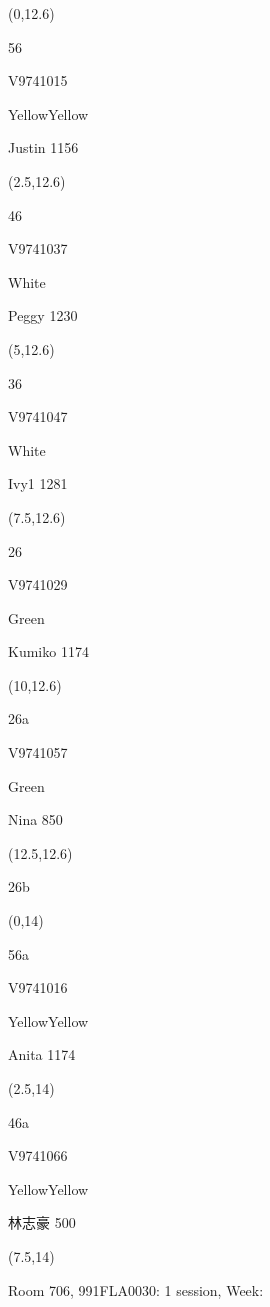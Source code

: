 \documentclass[a4paper]{article}
\newcommand{\myseat}[5]{%
\vspace{-0.1cm}
\parbox[t][2.2cm][t]{3.5cm}{
\small #1 %
\begin{description}
\vspace{-0.1cm}
\item [ID:] #2
\vspace{-0.1cm}
\item [Team:] #3 \normalsize
\vspace{-0.1cm}
\item \normalsize #4 #5
\vspace{-0.1cm}
\end{description}
}
}
\begin{document}
\begin{CJK}{UTF8}{cyberbit}
\begin{textblock}{2.5}(0,12.6)
\myseat{56}{V9741015}{YellowYellow}{Justin}{1156}
\end{textblock}

\begin{textblock}{2.5}(2.5,12.6)
\myseat{46}{V9741037}{White}{Peggy}{1230}
\end{textblock}

\begin{textblock}{2.5}(5,12.6)
\myseat{36}{V9741047}{White}{Ivy1}{1281}
\end{textblock}

\begin{textblock}{2.5}(7.5,12.6)
\myseat{26}{V9741029}{Green}{Kumiko}{1174}
\end{textblock}

\begin{textblock}{2.5}(10,12.6)
\myseat{26a}{V9741057}{Green}{Nina}{850}
\end{textblock}

\begin{textblock}{2.5}(12.5,12.6)
\textblockcolor{}
\myseat{26b}{}{}{}{}
\end{textblock}

\begin{textblock}{2.5}(0,14)
\myseat{56a}{V9741016}{YellowYellow}{Anita}{1174}
\end{textblock}

\begin{textblock}{2.5}(2.5,14)
\myseat{46a}{V9741066}{YellowYellow}{林志豪}{500}
\end{textblock}

\begin{textblock}{7.5}(7.5,14)
\textblockcolor{}
\parbox[t][2.2cm][t]{9.5cm}{%
\large Room 706, 991FLA0030: 1 session, Week: 
}
\end{textblock}

\end{CJK}
\end{document}
